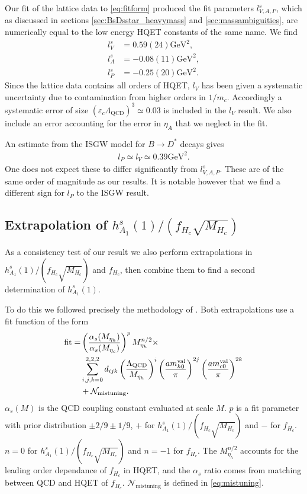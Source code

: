 Our fit of the lattice data to \eqref{eq:fitform} produced the fit parameters $l^s_{V,A,P}$, which as discussed in sections \ref{sec:BsDsstar_heavymass} and \ref{sec:massambiguities}, are numerically equal to the low energy HQET constants of the same name. We find
\begin{align}
  \nonumber  l^s_V &= 0.59(24)\text{GeV}^2, \\  l^s_A &= -0.08(11)\text{GeV}^2, \label{eq:hqet_constants}
  \\ \nonumber l^s_P &= -0.25(20)\text{GeV}^2.
\end{align}
Since the lattice data contains all orders of HQET, $l_V$ has been given a systematic uncertainty due to contamination from higher orders in $1/m_c$. Accordingly a systematic error of size $(\varepsilon_c \Lambda_{\text{QCD}})^3 \simeq 0.03$ is included in the $l_V$ result. We also include an error accounting for the error in $\eta_A$ that we neglect in the fit.

An estimate from the ISGW model for $B\to D^*$ decays gives \cite{PhysRevD.39.799}
\begin{align}
  l_P \simeq l_V \simeq 0.39\text{GeV}^2.
\end{align}
One does not expect these to differ significantly from $l_{V,A,P}^s$. These are of the same order of magnitude as our results. It is notable however that we find a different sign for $l_P$ to the ISGW result.

\subsection{Extrapolation of $h_{A_1}^s(1)/(f_{H_c}\sqrt{M_{H_c}})$}
\label{sec:ratio_extrap}

As a consistency test of our result we also perform extrapolations in $h_{A_1}^s(1)/(f_{H_c}\sqrt{M_{H_c}})$ and $f_{H_c}$, then combine them to find a second determination of $h_{A_1}^s(1)$.

To do this we followed precisely the methodology of \cite{McNeile:2012qf}. Both extrapolations use a fit function of the form
\begin{align}
  \label{eq:fitfun_ratio}
  \nonumber
  \text{fit} = &\left({\alpha_s(M_{\eta_h})\over\alpha_s(M_{\eta_c})}\right)^p M_{\eta_h}^{n/2} \times \\ &\sum_{i,j,k=0}^{2,2,2} d_{ijk} \left({\Lambda_{\text{QCD}}\over M_{\eta_h} }\right)^{i} \left({ am^{\text{val}}_{h0} \over \pi }\right)^{2j} \left({ am^{\text{val}}_{c0} \over \pi }\right)^{2k} \\
  &+ \mathcal{N}_{\text{mistuning}}.
  \nonumber
\end{align}
$\alpha_s(M)$ is the QCD coupling constant evaluated at scale $M$. $p$ is a fit parameter with prior distribution $\pm2/9\pm 1/9$, $+$ for $h_{A_1}^s(1)/(f_{H_c}\sqrt{M_{H_c}})$ and $-$ for $f_{H_c}$. $n=0$ for $h_{A_1}^s(1)/(f_{H_c}\sqrt{M_{H_c}})$ and $n=-1$ for $f_{H_c}$. The $M_{\eta_h}^{n/2}$ accounts for the leading order dependance of $f_{H_c}$ in HQET, and the $\alpha_s$ ratio comes from matching between QCD and HQET of $f_{H_c}$. $\mathcal{N}_{\text{mistuning}}$ is defined in \ref{eq:mistuning}.

